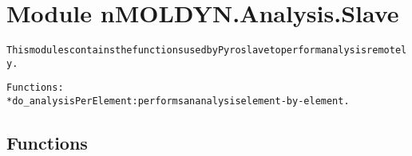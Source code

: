 %
%
%


\section{Module nMOLDYN.Analysis.Slave}

    \label{nMOLDYN:Analysis:Slave}
\begin{alltt}
This modules contains the functions used by Pyro slave to perform analysis remotely.

Functions:
    * do\_analysisPerElement: performs an analysis element-by-element.
\end{alltt}



  \subsection{Functions}

    \label{nMOLDYN:Analysis:Slave:do_analysisPerElement}

    \vspace{0.5ex}

